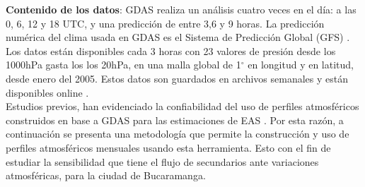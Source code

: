 
\textbf{Contenido de los datos}: GDAS realiza un análisis cuatro veces en el día: a las 0, 6, 12 y 18 UTC, y una predicción de entre 3,6 y 9 horas. La predicción numérica del clima usada en GDAS es el Sistema de Predicción Global (GFS) \cite{GFS}. Los datos están disponibles cada 3 horas con 23 valores de presión desde los 1000hPa gasta los los 20hPa, en una malla global de  1$^{\circ}$ en longitud y en latitud, desde enero del 2005. Estos datos son guardados en archivos semanales y están disponibles online \cite{GDAS_data}. \\

Estudios previos, han evidenciado la confiabilidad del uso de perfiles atmosféricos construidos en base a GDAS para las estimaciones de EAS \cite{GAP_2011}. Por esta razón, a continuación se presenta una metodología que permite la construcción y uso de perfiles atmosféricos mensuales usando esta herramienta. Esto con el fin de estudiar la sensibilidad que tiene el flujo de secundarios ante variaciones atmosféricas, para la ciudad de Bucaramanga.

